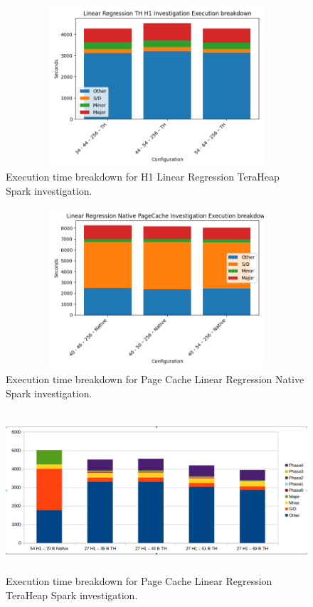 \begin{figure}[ht!]
    \includegraphics[width=12cm,height=6cm]{./fig/linr_h1_th.png}
    \caption{Execution time breakdown for H1 Linear Regression
    TeraHeap Spark investigation.}
    \label{fig:linr_h1_th}
\end{figure}

\begin{figure}[ht!]
    \includegraphics[width=12cm,height=6cm]{./fig/linr_pc_native.png}
    \caption{Execution time breakdown for Page Cache Linear Regression
    Native Spark investigation.}
    \label{fig:linr_pc_native}
\end{figure}

\begin{figure}[ht!]
    \includegraphics[width=12cm,height=6cm]{./fig/linr_pc_th.png}
    \caption{Execution time breakdown for Page Cache Linear Regression TeraHeap Spark investigation.}
    \label{fig:linr_pc_th}
\end{figure}

